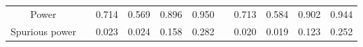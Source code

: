 % 
\begin{tabular}{ccccccccccc}
  \hline
  \hline
Power &  & 0.714 & 0.569 & 0.896 & 0.950 &  & 0.713 & 0.584 & 0.902 & 0.944 \\ 
  Spurious power &  & 0.023 & 0.024 & 0.158 & 0.282 &  & 0.020 & 0.019 & 0.123 & 0.252 \\ 
   \hline
\end{tabular}
